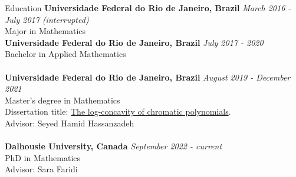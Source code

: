 \documentclass{resume} %
\begin{document}

\begin{rSection}{Education}
{\bf Universidade Federal do Rio de Janeiro, Brazil} \hfill {\em March 2016 - July 2017 (interrupted)} 
\\ Major in Mathematics\\
{\bf Universidade Federal do Rio de Janeiro, Brazil} \hfill {\em July 2017 - 2020} 
\\ Bachelor in Applied Mathematics
\\
\\{\bf Universidade Federal do Rio de Janeiro, Brazil} \hfill {\em August 2019 - December 2021} 
\\ Master's degree in Mathematics
\\ Dissertation title: \href{https://hollebenthiago.github.io/msc/main.pdf}{The log-concavity of chromatic polynomials}.
\\ Advisor: Seyed Hamid Hassanzadeh
\\
\\{\bf Dalhousie University, Canada} \hfill {\em September 2022 - current} 
\\ PhD in Mathematics
\\ Advisor: Sara Faridi

\end{rSection}



\end{document}
